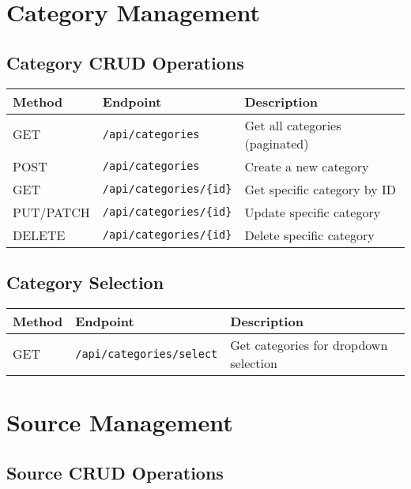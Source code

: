 \documentclass[12pt,a4paper]{article}
\begin{document}
\section{Category Management}

\subsection{Category CRUD Operations}

\begin{longtable}{|p{}|p{}|p{}|}
\hline
\textbf{Method} & \textbf{Endpoint} & \textbf{Description} \\
\hline
\endhead

GET & \texttt{/api/categories} & Get all categories (paginated) \\
POST & \texttt{/api/categories} & Create a new category \\
GET & \texttt{/api/categories/\{id\}} & Get specific category by ID \\
PUT/PATCH & \texttt{/api/categories/\{id\}} & Update specific category \\
DELETE & \texttt{/api/categories/\{id\}} & Delete specific category \\
\hline
\end{longtable}

\subsection{Category Selection}

\begin{longtable}{|p{}|p{}|p{}|}
\hline
\textbf{Method} & \textbf{Endpoint} & \textbf{Description} \\
\hline
\endhead

GET & \texttt{/api/categories/select} & Get categories for dropdown selection \\
\hline
\end{longtable}

\section{Source Management}

\subsection{Source CRUD Operations}
\end{document}
